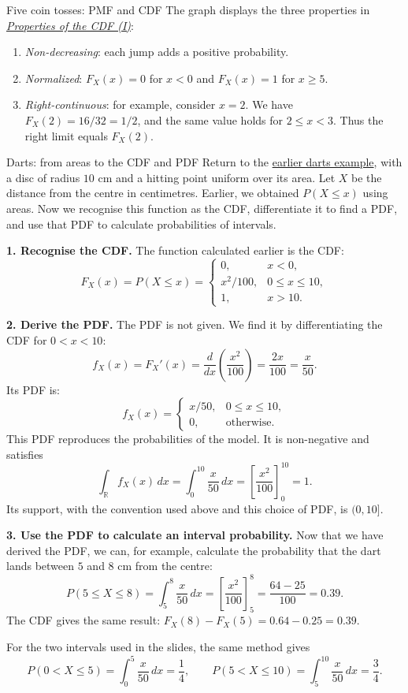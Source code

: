 \documentclass[a4paper,12pt,oneside]{report}
\begin{document}
\begin{framedexample}{Five coin tosses: PMF and CDF}
The graph displays the three properties in
\hyperref[prop:cdf-properties-i]{\emph{Properties of the CDF (I)}}:
\begin{enumerate}
  \item \emph{Non-decreasing}: each jump adds a positive probability.
  \item \emph{Normalized}: $F_X(x)=0$ for $x<0$ and $F_X(x)=1$ for $x\geq5$.
  \item \emph{Right-continuous}: for example, consider $x=2$.
    We have $F_X(2)=16/32=1/2$, and the same value holds for
    $2\leq x<3$. Thus the right limit equals $F_X(2)$.
\end{enumerate}
\end{framedexample}

\clearpage
\begin{framedexample}{Darts: from areas to the CDF and PDF}
Return to the \hyperref[ex:darts-areas]{earlier darts example}, with
a disc of radius $10$ cm and a hitting point uniform over its area.
Let $X$ be the distance from the centre in centimetres.
Earlier, we obtained $P(X\leq x)$ using areas. Now we recognise
this function as the CDF, differentiate it to find a PDF, and use
that PDF to calculate probabilities of intervals.

\textbf{1. Recognise the CDF.}
The function calculated earlier is the CDF:
\[
  F_X(x)=P(X\leq x)=
  \begin{cases}
    0, & x<0,\\
    x^2/100, & 0\leq x\leq10,\\
    1, & x>10.
  \end{cases}
\]

\textbf{2. Derive the PDF.}
The PDF is not given. We find it by differentiating the CDF for
$0<x<10$:
\[
  f_X(x)=F_X'(x)
    =\frac{d}{dx}\left(\frac{x^2}{100}\right)
    =\frac{2x}{100}=\frac{x}{50}.
\]
Its PDF is:
\[
  f_X(x)=
  \begin{cases}
    x/50, & 0\leq x\leq10,\\
    0, & \text{otherwise}.
  \end{cases}
\]
This PDF reproduces the probabilities of the model. It is non-negative
and satisfies
\[
  \int_{\mathbb R}f_X(x)\,dx
    =\int_0^{10}\frac{x}{50}\,dx
    =\left[\frac{x^2}{100}\right]_0^{10}=1.
\]
Its support, with the convention used above and this choice of PDF,
is $(0,10]$.

\textbf{3. Use the PDF to calculate an interval probability.}
Now that we have derived the PDF, we can, for example, calculate the
probability that the dart lands between $5$ and $8$ cm from the centre:
\[
  P(5\leq X\leq8)
    =\int_5^8\frac{x}{50}\,dx
    =\left[\frac{x^2}{100}\right]_5^8
    =\frac{64-25}{100}=0.39.
\]
The CDF gives the same result:
$F_X(8)-F_X(5)=0.64-0.25=0.39$.

For the two intervals used in the slides, the same method gives
\[
  P(0<X\leq5)=\int_0^5\frac{x}{50}\,dx=\frac14,
  \qquad
  P(5<X\leq10)=\int_5^{10}\frac{x}{50}\,dx=\frac34.
\]
\end{framedexample}
\end{document}
